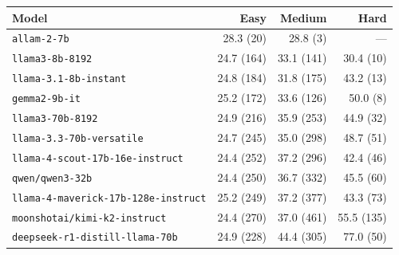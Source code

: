 \begin{tabular}{lrrr}
\hline\hline
\textbf{Model} & \textbf{Easy} & \textbf{Medium} & \textbf{Hard} \\
\hline
\texttt{allam-2-7b} & 28.3 {\scriptsize(20)} & 28.8 {\scriptsize(3)} & --- \\
\texttt{llama3-8b-8192} & 24.7 {\scriptsize(164)} & 33.1 {\scriptsize(141)} & 30.4 {\scriptsize(10)} \\
\texttt{llama-3.1-8b-instant} & 24.8 {\scriptsize(184)} & 31.8 {\scriptsize(175)} & 43.2 {\scriptsize(13)} \\
\texttt{gemma2-9b-it} & 25.2 {\scriptsize(172)} & 33.6 {\scriptsize(126)} & 50.0 {\scriptsize(8)} \\
\texttt{llama3-70b-8192} & 24.9 {\scriptsize(216)} & 35.9 {\scriptsize(253)} & 44.9 {\scriptsize(32)} \\
\texttt{llama-3.3-70b-versatile} & 24.7 {\scriptsize(245)} & 35.0 {\scriptsize(298)} & 48.7 {\scriptsize(51)} \\
\texttt{llama-4-scout-17b-16e-instruct} & 24.4 {\scriptsize(252)} & 37.2 {\scriptsize(296)} & 42.4 {\scriptsize(46)} \\
\texttt{qwen/qwen3-32b} & 24.4 {\scriptsize(250)} & 36.7 {\scriptsize(332)} & 45.5 {\scriptsize(60)} \\
\texttt{llama-4-maverick-17b-128e-instruct} & 25.2 {\scriptsize(249)} & 37.2 {\scriptsize(377)} & 43.3 {\scriptsize(73)} \\
\texttt{moonshotai/kimi-k2-instruct} & 24.4 {\scriptsize(270)} & 37.0 {\scriptsize(461)} & 55.5 {\scriptsize(135)} \\
\texttt{deepseek-r1-distill-llama-70b} & 24.9 {\scriptsize(228)} & 44.4 {\scriptsize(305)} & 77.0 {\scriptsize(50)} \\
\hline\hline
\end{tabular}

